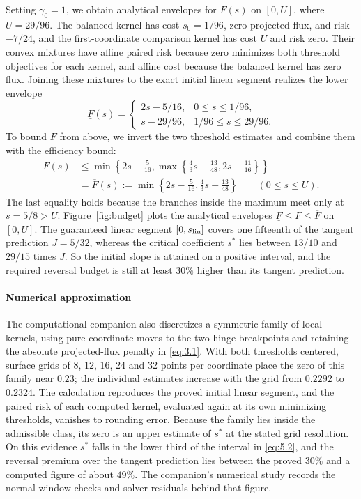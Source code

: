 \label{par:uniform-envelopes}
Setting \(\gamma_0=1\), we obtain analytical envelopes for \(F(s)\) on \([0,U]\), where \(U=29/96\). The balanced kernel has cost \(s_0=1/96\), zero projected flux, and risk \(-7/24\), and the first-coordinate comparison kernel has cost \(U\) and risk zero. Their convex mixtures have affine paired risk because zero minimizes both threshold objectives for each kernel, and affine cost because the balanced kernel has zero flux. Joining these mixtures to the exact initial linear segment realizes the lower envelope
\[
\underline F(s)=
\begin{cases}
2s-5/16,&0\le s\le1/96,\\
s-29/96,&1/96\le s\le29/96.
\end{cases}
\]
To bound \(F\) from above, we invert the two threshold estimates and combine them with the efficiency bound:
\[
\begin{aligned}
F(s)&\le\min\left\{2s-\frac5{16},
\max\left\{\frac43s-\frac{13}{48},2s-\frac{11}{16}\right\}\right\}
\\
&=\overline F(s):=\min\left\{2s-\frac5{16},\frac43s-\frac{13}{48}\right\}
\qquad(0\le s\le U).
\end{aligned}
\]
The last equality holds because the branches inside the maximum meet only at \(s=5/8>U\). Figure~\ref{fig:budget} plots the analytical envelopes \(\underline F\le F\le\overline F\) on \([0,U]\). The guaranteed linear segment \([0,s_{\rm lin}]\) covers one fifteenth of the tangent prediction \(J=5/32\), whereas the critical coefficient \(s^*\) lies between \(13/10\) and \(29/15\) times \(J\). So the initial slope is attained on a positive interval, and the required reversal budget is still at least \(30\%\) higher than its tangent prediction.


\paragraph{Numerical approximation}
The computational companion also discretizes a symmetric family of local
kernels, using pure-coordinate moves to the two hinge breakpoints and
retaining the absolute projected-flux penalty in \eqref{eq:3.1}.
With both thresholds centered, surface grids of 8, 12, 16, 24 and 32 points
per coordinate place the zero of this family near \(0.23\); the individual
estimates increase with the grid from \(0.2292\) to \(0.2324\).
The calculation reproduces the proved initial linear segment, and the paired
risk of each computed kernel, evaluated again at its own minimizing
thresholds, vanishes to rounding error. Because the family lies inside the
admissible class, its zero is an upper estimate of \(s^*\) at the stated grid
resolution. On this evidence \(s^*\) falls in the lower third of
the interval in \eqref{eq:5.2}, and the reversal premium over the tangent
prediction lies between the proved \(30\%\) and a computed figure of about
\(49\%\). The companion's numerical study records the normal-window checks
and solver residuals behind that figure.

